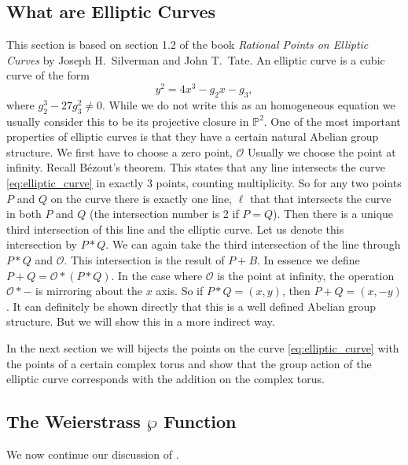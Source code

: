 \documentclass[titlepage,a4paper]{article}
\theoremstyle{theoremdd}
\theoremstyle{definitiondd}
\theoremstyle{remarkdd}
\begin{document}
\subsection{What are Elliptic Curves}
This section is based on section 1.2 of the book \emph{Rational Points on Elliptic Curves} by Joseph H.\ Silverman and John T.\ Tate\cite{silvermanRationalPointsElliptic2015}.
An elliptic curve is a cubic curve of the form \begin{equation}\label{eq:elliptic_curve}
y^2 = 4x^3 - g_2x - g_3
,\end{equation}
where $g_2^3 - 27 g_3^2 \ne 0$. 
While we do not write this as an homogeneous equation we usually consider this to be its projective closure in $\mathbb{P}^2$. 
One of the most important properties of elliptic curves is that they have a certain natural Abelian group structure. 
We first have to choose a zero point, $\mathcal{O} $ Usually we choose the point at infinity.
Recall B\'ezout's theorem. 
This states that any line intersects the curve \eqref{eq:elliptic_curve} in exactly 3 points, counting multiplicity.  
So for any two points $P$ and $Q$ on the curve there is exactly one line, $\ell$ that that intersects the curve in both $P$ and $Q$ (the intersection number is 2  if $P = Q$). 
Then there is a unique third intersection of this line and the elliptic curve. Let us denote this intersection by $P*Q$.
We can again take the third intersection of the line through $P*Q$ and $\mathcal{O}$. This intersection is the result of $P + B$.
In essence we define $P + Q =\mathcal{O} *(P*Q)$.
In the case where $\mathcal{O} $ is the point at infinity, the operation $\mathcal{O} * -$ is mirroring about the $x$ axis. So if $P * Q = (x,y)$, then $P + Q = (x, -y)$.
It can definitely be shown directly that this is a well defined Abelian group structure. But we will show this in a more indirect way. 

In the next section we will bijects the points on the curve \eqref{eq:elliptic_curve} with the points of a certain complex torus and show that the group action of the elliptic curve corresponds with the addition on the complex torus.

\subsection{The Weierstrass $\wp$ Function} \label{sec:The_Weierstrass_wp_Function}
We now continue our discussion of \cite{diamondFirstCourseModular2005a}.
\end{document}

